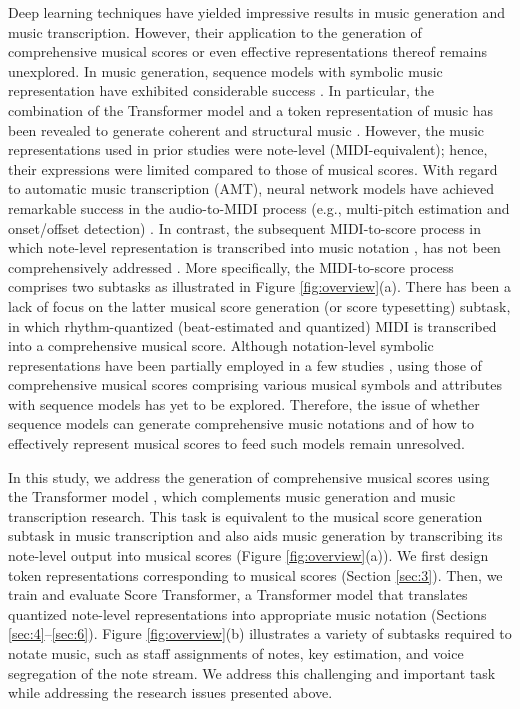 \documentclass[sigconf]{acmart} %
\begin{document}
Deep learning techniques have yielded impressive results in music generation and music transcription. However, their application to the generation of comprehensive musical scores or even effective representations thereof remains unexplored. In music generation, sequence models with symbolic music representation have exhibited considerable success \cite{Huang2020, Oore2018}. In particular, the combination of the Transformer model \cite{Vaswani2017} and a token representation of music has been revealed to generate coherent and structural music \cite{Huang2019, Ji2020}. However, the music representations used in prior studies were note-level (MIDI-equivalent); hence, their expressions were limited compared to those of musical scores. With regard to automatic music transcription (AMT), neural network models have achieved remarkable success in the audio-to-MIDI process (e.g., multi-pitch estimation and onset/offset detection) \cite{Benetos2019}. In contrast, the subsequent MIDI-to-score process in which note-level representation is transcribed into music notation \cite{Foscarin2019}, has not been comprehensively addressed \cite{Cogliati2016}. More specifically, the MIDI-to-score process comprises two subtasks \cite{Foscarin2019, Nakamura2018, Shibata2020} as illustrated in Figure \ref{fig:overview}(a). There has been a lack of focus on the latter musical score generation (or score typesetting) subtask, in which rhythm-quantized (beat-estimated and quantized) MIDI is transcribed into a comprehensive musical score. Although notation-level symbolic representations have been partially employed in a few studies \cite{Carvalho2017, Liu2021, Roman2018, Roman2019}, using those of comprehensive musical scores comprising various musical symbols and attributes with sequence models has yet to be explored. Therefore, the issue of whether sequence models can generate comprehensive music notations and of how to effectively represent musical scores to feed such models remain unresolved.

In this study, we address the generation of comprehensive musical scores using the Transformer model \cite{Vaswani2017}, which complements music generation and music transcription research. This task is equivalent to the musical score generation subtask in music transcription and also aids music generation by transcribing its note-level output into musical scores (Figure \ref{fig:overview}(a)). We first design token representations corresponding to musical scores (Section \ref{sec:3}). Then, we train and evaluate Score Transformer, a Transformer model that translates quantized note-level representations into appropriate music notation (Sections \ref{sec:4}–\ref{sec:6}).
Figure \ref{fig:overview}(b) illustrates a variety of subtasks required to notate music, such as staff assignments of notes, key estimation, and voice segregation of the note stream. We address this challenging and important task while addressing the research issues presented above.
\end{document}
